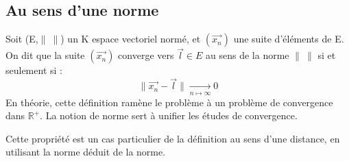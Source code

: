 \subsection{Au sens d'une norme}
\begin{de}
Soit (E,$\parallel~\parallel$) un K espace vectoriel normé, et $(\overrightarrow{x_n})$ une suite d'éléments de E.\\
On dit que la suite $(\overrightarrow{x_n})$ converge vers $\overrightarrow{l} \in E$ au sens de la norme $\parallel~\parallel$ si et seulement si :
$$\parallel \overrightarrow{x_n} - \overrightarrow{l} \parallel \underset{n \mapsto \infty }\rightarrow 0$$
En théorie, cette définition ramène le problème à un problème de convergence dans $\mathbb{R}^+$. La notion de norme sert à unifier les études de convergence.
\end{de}
\begin{prop}
Cette propriété est un cas particulier de la définition au sens d'une distance, en utilisant la norme déduit de la norme.
\end{prop}
